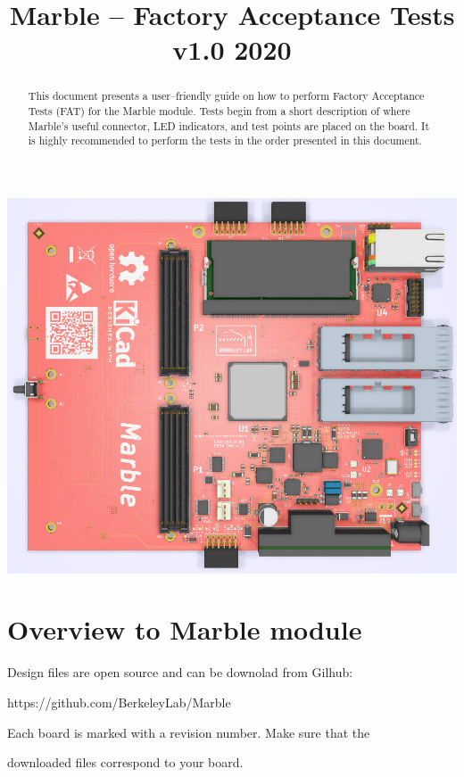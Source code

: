 \documentclass[12pt,oneside,a4]{article}
\title{Marble -- Factory Acceptance Tests\\ \small{v1.0 2020}}
\begin{document}
\maketitle
\begin{center}
\includegraphics[width=0.8\linewidth]{marble_top.png}
\end{center}
\begin{abstract}
This document presents a user--friendly guide on how to perform Factory Acceptance Tests (FAT) for the Marble module. Tests begin from a short description of where Marble's useful connector, LED indicators, and test points are placed on the board. It is highly recommended to perform the tests in the order presented in this document.
\end{abstract}

\clearpage
\tableofcontents

\clearpage

\section{Overview to Marble module}

\begin{leftbar}
Design files are open source and can be downolad from Gilhub:

https://github.com/BerkeleyLab/Marble
\end{leftbar}


\begin{leftbar}
Each board is marked with a revision number. Make sure that the

downloaded files correspond to your board.
\end{leftbar}
\end{document}
